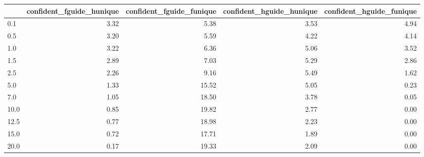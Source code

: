 \begin{tabular}{lrrrr}
\toprule
 & confident_fguide_hunique & confident_fguide_funique & confident_hguide_hunique & confident_hguide_funique \\
\midrule
0.1 & 3.32 & 5.38 & 3.53 & 4.94 \\
0.5 & 3.20 & 5.59 & 4.22 & 4.14 \\
1.0 & 3.22 & 6.36 & 5.06 & 3.52 \\
1.5 & 2.89 & 7.03 & 5.29 & 2.86 \\
2.5 & 2.26 & 9.16 & 5.49 & 1.62 \\
5.0 & 1.33 & 15.52 & 5.05 & 0.23 \\
7.0 & 1.05 & 18.50 & 3.78 & 0.05 \\
10.0 & 0.85 & 19.82 & 2.77 & 0.00 \\
12.5 & 0.77 & 18.98 & 2.23 & 0.00 \\
15.0 & 0.72 & 17.71 & 1.89 & 0.00 \\
20.0 & 0.17 & 19.33 & 2.09 & 0.00 \\
\bottomrule
\end{tabular}
